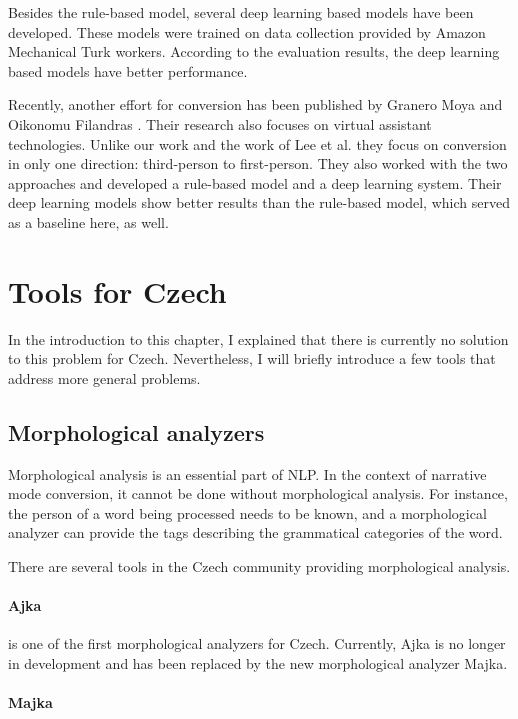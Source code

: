 Besides the rule-based model, several deep learning based models have been developed. These models were trained on data collection provided by Amazon Mechanical Turk workers. According to the evaluation results, the deep learning based models have better performance.

Recently, another effort for conversion has been published by Granero Moya and Oikonomu Filandras \cite{granero-moya-oikonomou-filandras-2021-taking}. Their research also focuses on virtual assistant technologies. Unlike our work and the work of Lee et al. they focus on conversion in only one direction: third-person to first-person. They also worked with the two approaches and developed a rule-based model and a deep learning system. Their deep learning models show better results than the rule-based model, which served as a baseline here, as well.

\section{Tools for Czech}

In the introduction to this chapter, I explained that there is currently no solution to this problem for Czech. Nevertheless, I will briefly introduce a few tools that address more general problems.

\subsection{Morphological analyzers}

Morphological analysis is an essential part of NLP. In the context of narrative mode conversion, it cannot be done without morphological analysis. For instance, the person of a word being processed needs to be known, and a morphological analyzer can provide the tags describing the grammatical categories of the word.

There are several tools in the Czech community providing morphological analysis.

\paragraph{Ajka}

is one of the first morphological analyzers for Czech. Currently, Ajka is no longer in development and has been replaced by the new morphological analyzer Majka. \cite{Sedlacekthesis}

\paragraph{Majka}

